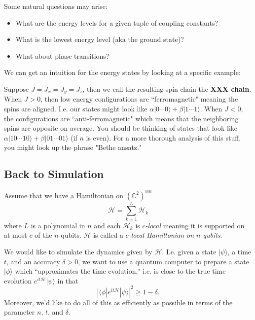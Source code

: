 \documentclass{article}
\newcommand{\ket}[1]{|#1\rangle}
\begin{document}
\vspace{0.5cm}

Some natural questions may arise: 
\begin{itemize}
    \item What are the energy levels for a given tuple of coupling constants?
    \item What is the lowest energy level (aka the ground state)?
    \item What about phase transitions?
\end{itemize}

We can get an intuition for the energy states by looking at a specific example:

\vspace{0.5cm}

Suppose $J=J_x = J_y=J_z$, then we call the resulting spin chain the \textbf{XXX chain}. When $J>0$, then low energy configurations are ``ferromagnetic" meaning the spins are aligned. I.e. our states might look like $\alpha |0\cdots 0\rangle + \beta|1\cdots 1\rangle$. When $J<0$, the configurations are ``anti-ferromagnetic" which means that the neighboring spins are opposite on average. You should be thinking of states that look like $\alpha |10\cdots 10\rangle + \beta|01\cdots 01\rangle$ (if $n$ is even). For a more thorough analysis of this stuff, you might look up the phrase "Bethe ansatz."


\subsection{Back to Simulation}

Assume that we have a Hamiltonian on $(\mathbb C^2)^{\otimes n}$ $$\mathcal H = \sum_{k=1}^L \mathcal H_k$$ where $L$ is a polynomial in $n$ and each $\mathcal H_k$ is \textit{$c$-local} meaning it is supported on at most $c$ of the $n$ qubits. $\mathcal H$ is called a \textit{$c$-local Hamiltonian on $n$ qubits}.

\vspace{0.5cm}

We would like to simulate the dynamics given by $\mathcal H$. I.e. given a state $|\psi\rangle$, a time $t$, and an accuracy $\delta>0$, we want to use a quantum computer to prepare a state $|\phi\rangle$ which ``approximates the time evolution," i.e. is close to the true time evolution $e^{it\mathcal{H}}\ket{\psi}$ in that $$\left |\langle \phi | e^{it\mathcal H}|\psi\rangle \right |^2 \geq 1-\delta.$$ Moreover, we'd like to do all of this as efficiently as possible in terms of the parameter $n$, $t$, and $\delta$.
\end{document}
